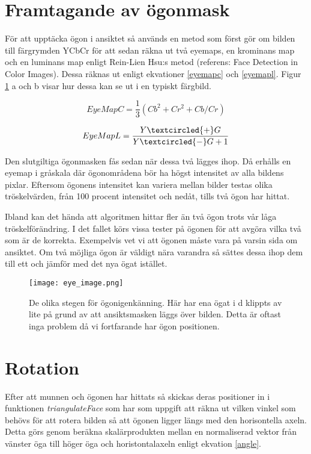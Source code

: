 \documentclass[a4paper,12pt,oneside,final]{extbook}
\begin{document}
\section{Framtagande av ögonmask}

För att upptäcka ögon i ansiktet så används en metod som först gör om bilden till färgrymden YCbCr för att sedan räkna ut två eyemaps, en krominans map och en luminans map enligt Rein-Lien Hsu:s metod (referens: Face Detection in Color Images). Dessa räknas ut enligt ekvationer \ref{eyemapc} och \ref{eyemapl}. Figur \ref{fig:eyemap} a och b visar hur dessa kan se ut i en typiskt färgbild.


\begin{equation} \label{eyemapc}
EyeMapC = \frac{1}{3} (Cb ^ 2 + Cr ^ 2 + Cb / Cr)
\end{equation}

\begin{equation} \label{eyemapl}
EyeMapL = \frac{Y \textcircled{+} G}{Y \textcircled{-} G + 1}
\end{equation}


Den slutgiltiga ögonmasken fås sedan när dessa två lägges ihop. Då erhålls en eyemap i gråskala där ögonområdena bör ha högst intensitet av alla bildens pixlar. Eftersom ögonens intensitet kan variera mellan bilder testas olika tröskelvärden, från 100 procent intensitet och nedåt, tills två ögon har hittat.

Ibland kan det hända att algoritmen hittar fler än två ögon trots vår låga tröskelförändring. I det fallet körs vissa tester på ögonen för att avgöra vilka två som är de korrekta. Exempelvis vet vi att ögonen måste vara på varsin sida om ansiktet. Om två möjliga ögon är väldigt nära varandra så sättes dessa ihop dem till ett och jämför med det nya ögat istället.

\begin{figure}[!ht]
  \centering
      \texttt{[image: eye\_image.png]}
  \caption{De olika stegen för ögonigenkänning. Här har ena ögat i d klippts av lite på grund av att ansiktsmasken läggs över bilden. Detta är oftast inga problem då vi fortfarande har ögon positionen.}
  \label{fig:eyemap}
\end{figure}

\section{Rotation}

Efter att munnen och ögonen har hittats så skickas deras positioner in i funktionen \textit{triangulateFace} som har som uppgift att räkna ut vilken vinkel som behövs för att rotera bilden så att ögonen ligger längs med den horisontella axeln. Detta görs genom beräkna skalärprodukten mellan en normaliserad vektor från vänster öga till höger öga och horistontalaxeln enligt ekvation \ref{angle}.
\end{document}
